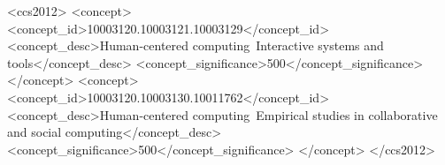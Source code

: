 \documentclass[sigconf,nonacm]{acmart}
\begin{document}
\begin{CCSXML}
<ccs2012>
   <concept>
       <concept_id>10003120.10003121.10003129</concept_id>
       <concept_desc>Human-centered computing~Interactive systems and tools</concept_desc>
       <concept_significance>500</concept_significance>
       </concept>
   <concept>
       <concept_id>10003120.10003130.10011762</concept_id>
       <concept_desc>Human-centered computing~Empirical studies in collaborative and social computing</concept_desc>
       <concept_significance>500</concept_significance>
       </concept>
 </ccs2012>
\end{CCSXML}




\end{document}
